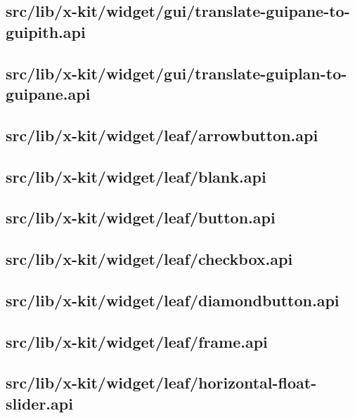 \subsection{src/lib/x-kit/widget/gui/translate-guipane-to-guipith.api}


\subsection{src/lib/x-kit/widget/gui/translate-guiplan-to-guipane.api}


\subsection{src/lib/x-kit/widget/leaf/arrowbutton.api}


\subsection{src/lib/x-kit/widget/leaf/blank.api}


\subsection{src/lib/x-kit/widget/leaf/button.api}


\subsection{src/lib/x-kit/widget/leaf/checkbox.api}


\subsection{src/lib/x-kit/widget/leaf/diamondbutton.api}


\subsection{src/lib/x-kit/widget/leaf/frame.api}


\subsection{src/lib/x-kit/widget/leaf/horizontal-float-slider.api}



